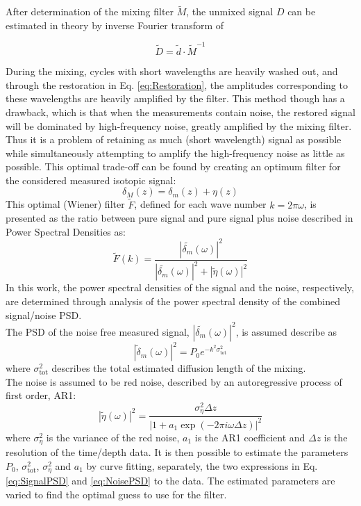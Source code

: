 \documentclass[../../CompleteThesis/Complete_1stDraft]{subfiles}
\begin{document}
After determination of the mixing filter $\tilde{M}$, the unmixed signal $D$ can be estimated in theory by inverse Fourier transform of


\begin{equation}
	\tilde{D} = \tilde{d}\cdot\tilde{M}^{-1}
	\label{eq:Restoration}
\end{equation}

During the mixing, cycles with short wavelengths are heavily washed out, and through the restoration in Eq. \ref{eq:Restoration}, the amplitudes corresponding to these wavelengths are heavily amplified by the filter. This method though has a drawback, which is that when the measurements contain noise, the restored signal will be dominated by high-frequency noise, greatly amplified by the mixing filter. Thus it is a problem of retaining as much (short wavelength) signal as possible while simultaneously attempting to amplify the high-frequency noise as little as possible. This optimal trade-off can be found by creating an optimum filter for the considered measured isotopic signal:
\begin{equation}
	\delta_M(z) = \delta_m (z) + \eta(z)
\end{equation} 
This optimal (Wiener) filter $\tilde{F}$, defined for each wave number $k = 2\pi \omega$, is presented as the ratio between pure signal and pure signal plus noise described in Power Spectral Densities as:
\begin{equation}
	\tilde{F}(k) =\frac{|\tilde{\delta_m}(\omega)|^2}{|\tilde{\delta_m}(\omega)|^2 + |\tilde{\eta}(\omega)|^2}
	\label{eq:WienerFilter}
\end{equation}
In this work, the power spectral densities of the signal and the noise, respectively, are determined through analysis of the power spectral density of the combined signal/noise PSD.\\
The PSD of the noise free measured signal, $|\tilde{\delta_m}(\omega)|^2$, is assumed describe as 
\begin{equation}
	|\tilde{\delta}_m(\omega)|^2 = P_0 e^{-k^2 \sigma_{\text{tot}}^2}
	\label{eq:SignalPSD}
\end{equation}
where $\sigma_{\text{tot}}^2$ describes the total estimated diffusion length of the mixing.\\
The noise is assumed to be red noise, described by an autoregressive process of first order, AR1:
\begin{equation}
	|\tilde{\eta}(\omega)|^2 = \frac{\sigma_{\eta}^2 \Delta z}{|1 + a_1 \exp(-2\pi i \omega \Delta z)|^2}
	\label{eq:NoisePSD}
\end{equation}
where $\sigma_{\eta}^2$ is the variance of the red noise, $a_1$ is the AR1 coefficient and $\Delta z$ is the resolution of the time/depth data.
It is then possible to estimate the parameters $P_0$, $\sigma_{\text{tot}}^2$, $\sigma_{\eta}^2$ and $a_1$ by curve fitting, separately, the two expressions in Eq. \ref{eq:SignalPSD} and \ref{eq:NoisePSD} to the data. The estimated parameters are varied to find the optimal guess to use for the filter.
\end{document}

